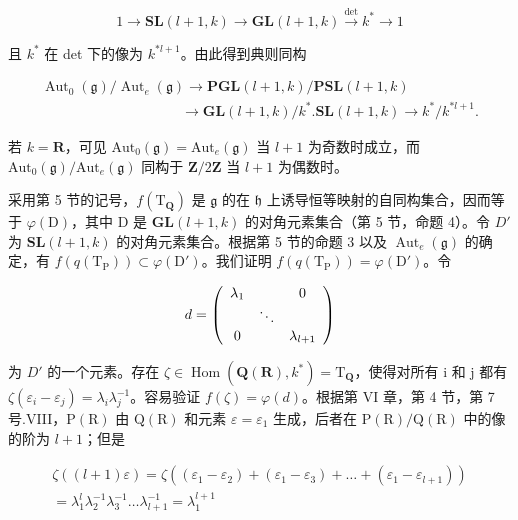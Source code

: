 \[
1 \longrightarrow \mathbf {S L} (l + 1, k) \longrightarrow \mathbf {G L} (l + 1, k) \stackrel {\det} {\longrightarrow} k ^ {*} \longrightarrow 1
\]

且 \(k^*\) 在 det 下的像为 \(k^{*l + 1}\)。由此得到典则同构

\[
\begin{array}{c} \operatorname{Aut} _ {0} (\mathfrak {g}) / \operatorname{Aut} _ {e} (\mathfrak {g}) \longrightarrow \mathbf {P G L} (l + 1, k) / \mathbf {P S L} (l + 1, k) \\ \qquad \qquad \qquad \qquad \qquad \longrightarrow \mathbf {G L} (l + 1, k) / k ^ {*}. \mathbf {S L} (l + 1, k) \longrightarrow k ^ {*} / k ^ {*   l + 1}. \end{array}
\]

若 \(k = \mathbf{R}\)，可见 \(\mathrm{Aut}_0(\mathfrak{g}) = \mathrm{Aut}_e(\mathfrak{g})\) 当 \(l + 1\) 为奇数时成立，而 \(\mathrm{Aut}_0(\mathfrak{g}) / \mathrm{Aut}_e(\mathfrak{g})\) 同构于 \(\mathbf{Z}/2\mathbf{Z}\) 当 \(l + 1\) 为偶数时。

采用第 5 节的记号，\(f(\mathrm{T}_{\mathbf{Q}})\) 是 \(\mathfrak{g}\) 的在 \(\mathfrak{h}\) 上诱导恒等映射的自同构集合，因而等于 \(\varphi(\mathrm{D})\)，其中 D 是 \(\mathbf{GL}(l+1,k)\) 的对角元素集合（第 5 节，命题 4）。令 \(D'\) 为 \(\mathbf{SL}(l+1,k)\) 的对角元素集合。根据第 5 节的命题 3 以及 \(\operatorname{Aut}_{e}(\mathfrak{g})\) 的确定，有 \(f(q(\mathrm{T}_{\mathrm{P}})) \subset \varphi(\mathrm{D}')\)。我们证明 \(f(q(\mathrm{T}_{\mathrm{P}})) = \varphi(\mathrm{D}')\)。令

\[
d = \left( \begin{array}{c c c} \lambda_ {1} & & 0 \\ & \ddots & \\ 0 & & \lambda_ {l + 1} \end{array} \right)
\]

为 \(D'\) 的一个元素。存在 \(\zeta \in \operatorname{Hom}(\mathbf{Q}(\mathbf{R}), k^{*}) = \mathrm{T}_{\mathbf{Q}}\)，使得对所有 i 和 j 都有 \(\zeta(\varepsilon_{i} - \varepsilon_{j}) = \lambda_{i}\lambda_{j}^{-1}\)。容易验证 \(f(\zeta) = \varphi(d)\)。根据第 VI 章，第 4 节，第 7 号.VIII，\(\mathrm{P}(\mathrm{R})\) 由 \(\mathrm{Q}(\mathrm{R})\) 和元素 \(\varepsilon = \varepsilon_{1}\) 生成，后者在 \(\mathrm{P}(\mathrm{R})/\mathrm{Q}(\mathrm{R})\) 中的像的阶为 \(l + 1\)；但是

\[
\begin{array}{c} \zeta ((l + 1) \varepsilon) = \zeta ((\varepsilon_ {1} - \varepsilon_ {2}) + (\varepsilon_ {1} - \varepsilon_ {3}) + \dots + (\varepsilon_ {1} - \varepsilon_ {l + 1})) \\ = \lambda_ {1} ^ {l} \lambda_ {2} ^ {- 1} \lambda_ {3} ^ {- 1} \ldots \lambda_ {l + 1} ^ {- 1} = \lambda_ {1} ^ {l + 1} \end{array}
\]


